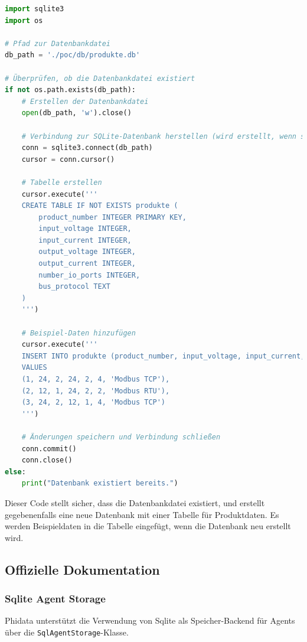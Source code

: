 \begin{lstlisting}[language=Python, style=pythonstyle, caption={Code zur Erstellung der Beispiel-Datenbank}]
import sqlite3
import os

# Pfad zur Datenbankdatei
db_path = './poc/db/produkte.db'

# Überprüfen, ob die Datenbankdatei existiert
if not os.path.exists(db_path):
    # Erstellen der Datenbankdatei
    open(db_path, 'w').close()

    # Verbindung zur SQLite-Datenbank herstellen (wird erstellt, wenn sie nicht existiert)
    conn = sqlite3.connect(db_path)
    cursor = conn.cursor()

    # Tabelle erstellen
    cursor.execute('''
    CREATE TABLE IF NOT EXISTS produkte (
        product_number INTEGER PRIMARY KEY,
        input_voltage INTEGER,
        input_current INTEGER,
        output_voltage INTEGER,
        output_current INTEGER,
        number_io_ports INTEGER,
        bus_protocol TEXT
    )
    ''')

    # Beispiel-Daten hinzufügen
    cursor.execute('''
    INSERT INTO produkte (product_number, input_voltage, input_current, output_voltage, output_current, number_io_ports, bus_protocol)
    VALUES
    (1, 24, 2, 24, 2, 4, 'Modbus TCP'),
    (2, 12, 1, 24, 2, 2, 'Modbus RTU'),
    (3, 24, 2, 12, 1, 4, 'Modbus TCP')
    ''')

    # Änderungen speichern und Verbindung schließen
    conn.commit()
    conn.close()
else:
    print("Datenbank existiert bereits.")
\end{lstlisting}

Dieser Code stellt sicher, dass die Datenbankdatei existiert, und erstellt gegebenenfalls eine neue Datenbank mit einer Tabelle für Produktdaten. Es werden Beispieldaten in die Tabelle eingefügt, wenn die Datenbank neu erstellt wird.

\subsection{Offizielle Dokumentation}

\subsubsection{Sqlite Agent Storage}

Phidata unterstützt die Verwendung von Sqlite als Speicher-Backend für Agents über die \texttt{SqlAgentStorage}-Klasse. \cite{phidata_sqliteagent}

